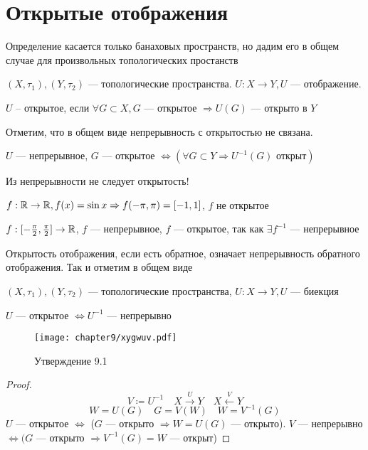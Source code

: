 \documentclass[document]{subfiles}
\begin{document}
\section{Открытые отображения}

Определение касается только банаховых пространств, но дадим его в общем случае для произвольных топологических простанств

\begin{definition}
    $(X, \tau_1), (Y, \tau_2)$ --- топологические пространства. $U: X \rightarrow Y, U$ --- отображение.

    $U$ -- открытое, если $\forall G \subset X, G$ --- открытое $\Rightarrow U(G)$ --- открыто в $Y$
    
\end{definition}

Отметим, что в общем виде непрерывность с открытостью не связана.
\begin{remark}
    $U$ --- непрерывное, $G$ --- открытое $\Leftrightarrow (\forall G \subset Y \Rightarrow U^{-1}(G) \text{ открыт})$
\end{remark}

Из непрерывности не следует открытость!
\begin{example}
    $f: \mathbb{R} \rightarrow \mathbb{R}, f(x) = \sin x \Rightarrow f(-\pi,\pi) = [-1,1]$, $f$ не открытое
\end{example}

\begin{example}
    $f: [-\frac{\pi}{2}, \frac{\pi}{2}] \rightarrow \mathbb{R}$, $f$ --- непрерывное, $f$ --- открытое, так как $\exists f^{-1}$ --- непрерывное
\end{example}


Открытость отображения, если есть обратное, означает непрерывность обратного отображения. Так и отметим в общем виде 

\begin{statement}
    $(X, \tau_1), (Y, \tau_2)$ --- топологические пространства, $U: X \rightarrow Y, U$ --- биекция 

    $U$ --- открытое $\Leftrightarrow U^{-1}$ --- непрерывно
\end{statement}
\begin{figure}
    \texttt{[image: chapter9/xygwuv.pdf]}\caption{Утверждение 9.1}
\end{figure}
\begin{proof}
    \[V \coloneqq U^{-1} \quad X \stackrel{U}{\longrightarrow} Y \quad X \stackrel{V}{\longleftarrow} Y \]
    \[ W = U(G) \quad G = V(W) \quad W = V^{-1}(G) \] 
    $U$ --- открытое $\Leftrightarrow$ ($G$ --- открыто $\Rightarrow W = U(G)$ --- открыто).
    $V$ --- непрерывно $\Leftrightarrow (G$ --- открыто $\Rightarrow V^{-1}(G) = W$ --- открыт)
\end{proof}
\end{document}
